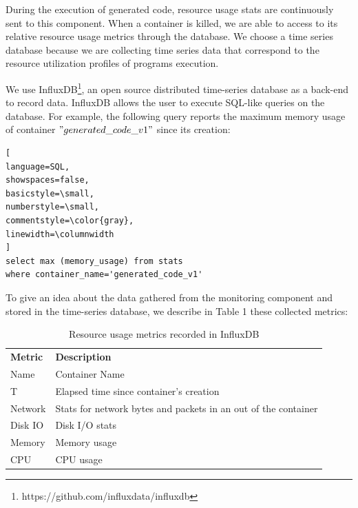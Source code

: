 During the execution of generated code, resource usage stats are continuously sent to this component. When a container is killed, we are able to access to its relative resource usage metrics through the database. We choose a time series database because we are collecting time series data that correspond to the resource utilization profiles of programs execution.

We use InfluxDB\footnote{https://github.com/influxdata/influxdb}, an open source distributed time-series database as a back-end to record data. InfluxDB allows the user to execute SQL-like queries on the database. For example, the following query reports the maximum memory usage of container $"generated\_code\_v1"$ since its creation:

\begin{lstlisting}[
language=SQL,
showspaces=false,
basicstyle=\small,
numberstyle=\small,
commentstyle=\color{gray},
linewidth=\columnwidth
]
select max (memory_usage) from stats 
where container_name='generated_code_v1'
\end{lstlisting}
To give an idea about the data gathered from the monitoring component and stored in the time-series database, we describe in Table 1 these collected metrics:
\begin{table}[h]
	\begin{center}
		\begin{tabular}{|p{1cm}|p{6.6cm}|}
			\hline
			\textbf{Metric} & \textbf{Description} \\
			\hhline{|=|=|}	
			Name & Container Name \\\hline
			
			T & Elapsed time since container's creation \\\hline
			
			Network  &  Stats for network bytes and packets in an out of the container \\\hline
			
			Disk IO &  Disk I/O stats \\\hline
			
			Memory  &  Memory usage \\\hline
			
			CPU &  CPU usage \\
			\hline
			
		\end{tabular}
		
	\end{center}
	\caption {Resource usage metrics recorded in InfluxDB}
\end{table}

